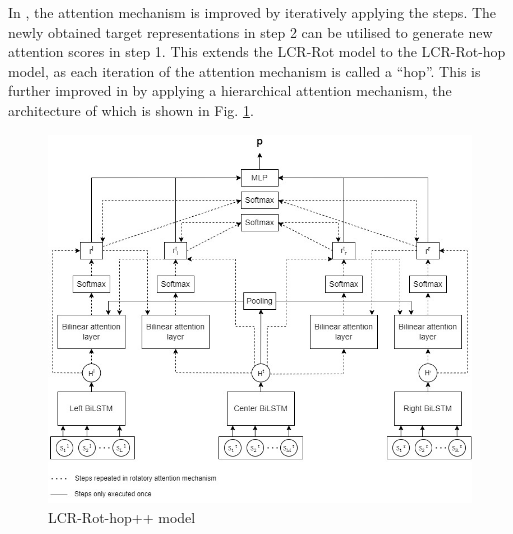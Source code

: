 In \cite{Wallaart2019}, the attention mechanism is improved by iteratively applying the steps. The newly obtained target representations in step 2 can be utilised to generate new attention scores in step 1. This extends the LCR-Rot model to the LCR-Rot-hop model, as each iteration of the attention mechanism is called a ``hop''. This is further improved in \cite{Trusca2020} by applying a hierarchical attention mechanism, the architecture of which is shown in Fig.  \ref{fig:haabsa++}.
\begin{figure}[h!]
    \centering
    \includegraphics[width=\textwidth]{Images/LCR-Rot-Hop++.jpg}
    \caption{LCR-Rot-hop++ model}
    \label{fig:haabsa++}
\end{figure}

